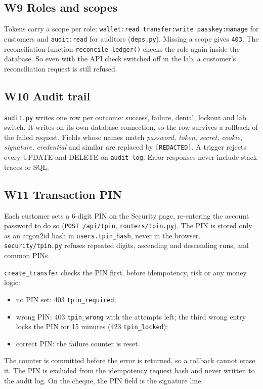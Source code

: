 \documentclass[11pt,a4paper]{article}
\newcommand{\code}[1]{\texttt{#1}}
\begin{document}
\subsection*{W9 Roles and scopes}
Tokens carry a scope per role: \code{wallet:read transfer:write passkey:manage} for customers and \code{audit:read} for auditors (\code{deps.py}). Missing a scope gives \code{403}. The reconciliation function \code{reconcile\_ledger()} checks the role again inside the database. So even with the API check switched off in the lab, a customer's reconciliation request is still refused.

\subsection*{W10 Audit trail}
\code{audit.py} writes one row per outcome: success, failure, denial, lockout and lab switch. It writes on its own database connection, so the row survives a rollback of the failed request. Fields whose names match \emph{password, token, secret, cookie, signature, credential} and similar are replaced by \code{[REDACTED]}. A trigger rejects every UPDATE and DELETE on \code{audit\_log}. Error responses never include stack traces or SQL.

\subsection*{W11 Transaction PIN}
Each customer sets a 6-digit PIN on the Security page, re-entering the account password to do so (\code{POST /api/tpin}, \code{routers/tpin.py}). The PIN is stored only as an argon2id hash in \code{users.tpin\_hash}, never in the browser. \code{security/tpin.py} refuses repeated digits, ascending and descending runs, and common PINs.

\code{create\_transfer} checks the PIN first, before idempotency, risk or any money logic:
\begin{itemize}
\item no PIN set: 403 \code{tpin\_required};
\item wrong PIN: 403 \code{tpin\_wrong} with the attempts left; the third wrong entry locks the PIN for 15 minutes (423 \code{tpin\_locked});
\item correct PIN: the failure counter is reset.
\end{itemize}
The counter is committed before the error is returned, so a rollback cannot erase it. The PIN is excluded from the idempotency request hash and never written to the audit log. On the cheque, the PIN field is the signature line.
\end{document}
